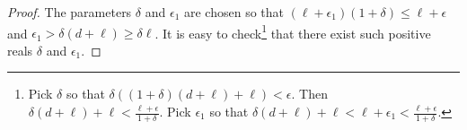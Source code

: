 \begin{proof}
The parameters $\delta$ and $\epsilon_1$ are chosen so that 
%
%
	 $ (\ell+\epsilon_1)(1+\delta)%
	 \le
	 \ell+\epsilon$ and $\epsilon_1>\delta(d+\ell)\ge \delta\ell$.
	 It is easy to check\footnote{Pick $\delta$ so that 
	 $\delta((1+\delta)(d+\ell)+\ell)<\epsilon$. Then $\delta(d+\ell)+\ell<\frac{\ell+\epsilon}{1+\delta}$. Pick $\epsilon_1$ so that $\delta(d+\ell)+\ell<\ell+\epsilon_1<\frac{\ell+\epsilon}{1+\delta}$.} that there exist such positive reals $\delta$ and $\epsilon_1$. 
 


\end{proof}
